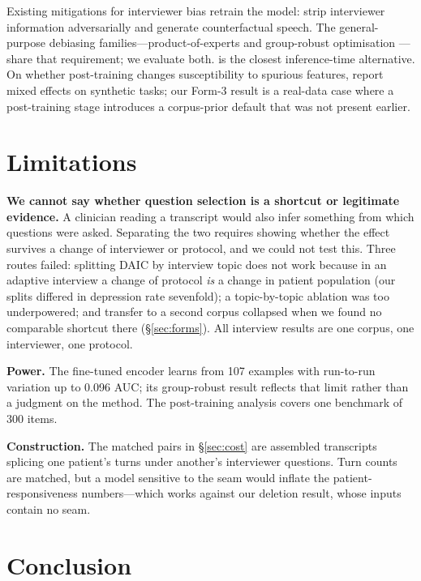 \documentclass{article}
\begin{document}
Existing mitigations for interviewer bias retrain the model:
\citet{zhang2025interviewerbias} strip interviewer information adversarially and
\citet{li2026depflow} generate counterfactual speech. The general-purpose
debiasing families---product-of-experts \citep{clark2019poe,sanh2020lmm} and
group-robust optimisation \citep{sagawa2019groupdro}---share that requirement;
we evaluate both. \citet{wu2025beyond} is the closest inference-time
alternative. On whether post-training changes susceptibility to spurious
features, \citet{shuieh2025robustness} report mixed effects on synthetic tasks;
our Form-3 result is a real-data case where a post-training stage introduces a
corpus-prior default that was not present earlier.

\section{Limitations}
\label{sec:limitations}

\textbf{We cannot say whether question selection is a shortcut or legitimate
evidence.} A clinician reading a transcript would also infer something from
which questions were asked. Separating the two requires showing whether the
effect survives a change of interviewer or protocol, and we could not test this.
Three routes failed: splitting DAIC by interview topic does not work because in
an adaptive interview a change of protocol \emph{is} a change in patient
population (our splits differed in depression rate sevenfold); a topic-by-topic
ablation was too underpowered; and transfer to a second corpus collapsed when we
found no comparable shortcut there (\S\ref{sec:forms}). All interview results
are one corpus, one interviewer, one protocol.

\textbf{Power.} The fine-tuned encoder learns from 107 examples with run-to-run
variation up to 0.096 AUC; its group-robust result reflects that limit rather
than a judgment on the method. The post-training analysis covers one benchmark
of 300 items.

\textbf{Construction.} The matched pairs in \S\ref{sec:cost} are assembled
transcripts splicing one patient's turns under another's interviewer questions.
Turn counts are matched, but a model sensitive to the seam would inflate the
patient-responsiveness numbers---which works against our deletion result, whose
inputs contain no seam.

\section{Conclusion}
\end{document}
